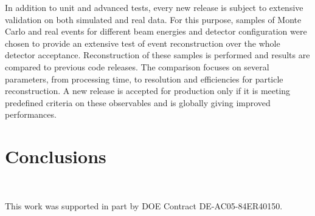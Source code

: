 \documentclass[3p,times,twocolumn]{elsarticle}
\begin{document}
In addition to unit and advanced tests, every new release is subject to extensive validation on both simulated and real data. For this purpose, samples of Monte Carlo and real events for different beam energies and detector configuration were chosen to provide an extensive test of event reconstruction over the whole detector acceptance. Reconstruction of these samples is performed and results are compared to previous code releases. The comparison focuses on several parameters, from processing time, to resolution and efficiencies for particle reconstruction. A new release is accepted for production only if it is meeting predefined criteria on these observables and is globally giving improved performances. 

\section{Conclusions}
~~

\ack

This work was supported in part by DOE Contract DE-AC05-84ER40150.
\end{document}
